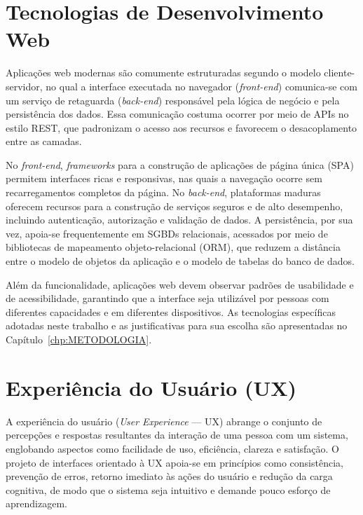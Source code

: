 \section{Tecnologias de Desenvolvimento Web}\label{sec:tecnologiasDesenvolvimentoWeb}

Aplicações web modernas são comumente estruturadas segundo o modelo cliente-servidor, no qual a interface executada no navegador (\textit{front-end}) comunica-se com um serviço de retaguarda (\textit{back-end}) responsável pela lógica de negócio e pela persistência dos dados. Essa comunicação costuma ocorrer por meio de APIs no estilo REST, que padronizam o acesso aos recursos e favorecem o desacoplamento entre as camadas. %

No \textit{front-end}, \textit{frameworks} para a construção de aplicações de página única (SPA) permitem interfaces ricas e responsivas, nas quais a navegação ocorre sem recarregamentos completos da página. No \textit{back-end}, plataformas maduras oferecem recursos para a construção de serviços seguros e de alto desempenho, incluindo autenticação, autorização e validação de dados. A persistência, por sua vez, apoia-se frequentemente em SGBDs relacionais, acessados por meio de bibliotecas de mapeamento objeto-relacional (ORM), que reduzem a distância entre o modelo de objetos da aplicação e o modelo de tabelas do banco de dados. %

Além da funcionalidade, aplicações web devem observar padrões de usabilidade e de acessibilidade, garantindo que a interface seja utilizável por pessoas com diferentes capacidades e em diferentes dispositivos. As tecnologias específicas adotadas neste trabalho e as justificativas para sua escolha são apresentadas no Capítulo~\ref{chp:METODOLOGIA}.

\section{Experiência do Usuário (UX)}\label{sec:ux}

A experiência do usuário (\textit{User Experience} — UX) abrange o conjunto de percepções e respostas resultantes da interação de uma pessoa com um sistema, englobando aspectos como facilidade de uso, eficiência, clareza e satisfação. %
O projeto de interfaces orientado à UX apoia-se em princípios como consistência, prevenção de erros, retorno imediato às ações do usuário e redução da carga cognitiva, de modo que o sistema seja intuitivo e demande pouco esforço de aprendizagem.

